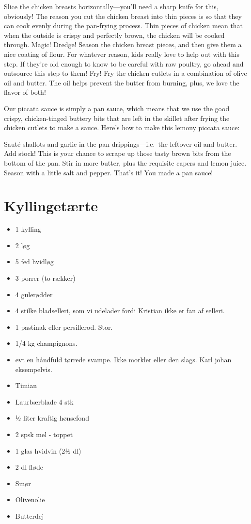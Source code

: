 \documentclass[
  letterpaper,
  DIV=11,
  numbers=noendperiod]{scrreprt}
\providecommand{\tightlist}{%
  \setlength{\itemsep}{0pt}\setlength{\parskip}{0pt}}\usepackage{longtable,booktabs,array}
\begin{document}
Slice the chicken breasts horizontally---you'll need a sharp knife for
this, obviously! The reason you cut the chicken breast into thin pieces
is so that they can cook evenly during the pan-frying process. Thin
pieces of chicken mean that when the outside is crispy and perfectly
brown, the chicken will be cooked through. Magic! Dredge! Season the
chicken breast pieces, and then give them a nice coating of flour. For
whatever reason, kids really love to help out with this step. If they're
old enough to know to be careful with raw poultry, go ahead and
outsource this step to them! Fry! Fry the chicken cutlets in a
combination of olive oil and butter. The oil helps prevent the butter
from burning, plus, we love the flavor of both!

Our piccata sauce is simply a pan sauce, which means that we use the
good crispy, chicken-tinged buttery bits that are left in the skillet
after frying the chicken cutlets to make a sauce. Here's how to make
this lemony piccata sauce:

Sauté shallots and garlic in the pan drippings---i.e.~the leftover oil
and butter. Add stock! This is your chance to scrape up those tasty
brown bits from the bottom of the pan. Stir in more butter, plus the
requisite capers and lemon juice. Season with a little salt and pepper.
That's it! You made a pan sauce!

\hypertarget{kyllingetuxe6rte}{%
\section{Kyllingetærte}\label{kyllingetuxe6rte}}

\begin{itemize}
\tightlist
\item
  1 kylling
\item
  2 løg
\item
  5 fed hvidløg
\item
  3 porrer (to rækker)
\item
  4 gulerødder
\item
  4 stilke bladselleri, som vi udelader fordi Kristian ikke er fan af
  selleri.
\item
  1 pastinak eller persillerod. Stor.
\item
  1/4 kg champignons.
\item
  evt en håndfuld tørrede svampe. Ikke morkler eller den slags. Karl
  johan eksempelvis.
\item
  Timian
\item
  Laurbærblade 4 stk
\item
  ½ liter kraftig hønsefond
\item
  2 spsk mel - toppet
\item
  1 glas hvidvin (2½ dl)
\item
  2 dl fløde
\item
  Smør
\item
  Olivenolie
\item
  Butterdej
\end{itemize}
\end{document}
